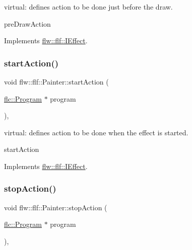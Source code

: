 virtual\+: defines action to be done just before the draw. 

pre\+Draw\+Action 

Implements \hyperlink{classflw_1_1flf_1_1IEffect_ae65eed21e40a226c7739d3c5dedd9e50}{flw\+::flf\+::\+I\+Effect}.

\mbox{\label{classflw_1_1flf_1_1Painter_aa5104b3f3db56f13d93172203f6fa105}} 
\subsubsection{\texorpdfstring{start\+Action()}{startAction()}}
{\footnotesize\ttfamily void flw\+::flf\+::\+Painter\+::start\+Action (\begin{DoxyParamCaption}\item[{\hyperlink{classflw_1_1flc_1_1Program}{flc\+::\+Program} $\ast$}]{program }\end{DoxyParamCaption})\hspace{0.3cm}{\ttfamily [override]}, {\ttfamily [virtual]}}



virtual\+: defines action to be done when the effect is started. 

start\+Action 

Implements \hyperlink{classflw_1_1flf_1_1IEffect_afc7cec9080d135ed264b08a90c7b94e9}{flw\+::flf\+::\+I\+Effect}.

\mbox{\label{classflw_1_1flf_1_1Painter_a8ab637228dbefe1befaa92825507ad0e}} 
\subsubsection{\texorpdfstring{stop\+Action()}{stopAction()}}
{\footnotesize\ttfamily void flw\+::flf\+::\+Painter\+::stop\+Action (\begin{DoxyParamCaption}\item[{\hyperlink{classflw_1_1flc_1_1Program}{flc\+::\+Program} $\ast$}]{program }\end{DoxyParamCaption})\hspace{0.3cm}{\ttfamily [override]}, {\ttfamily [virtual]}}



